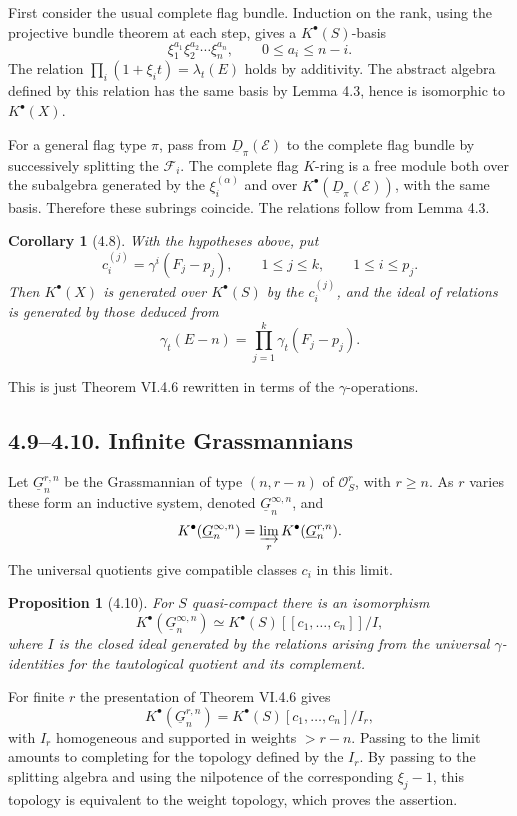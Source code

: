 \documentclass[13pt]{extarticle}
\newcommand{\cO}{\mathcal O}
\newtheorem*{proposition}{Proposition}
\newtheorem*{corollary}{Corollary}
\begin{document}
First consider the usual complete flag bundle. Induction on the rank, using the projective bundle theorem at each step, gives a $K^{\bullet}(S)$-basis
\[
\xi_1^{a_1}\xi_2^{a_2}\cdots\xi_n^{a_n},
\qquad
0\leq a_i\leq n-i.
\]
The relation $\prod_i(1+\xi_it)=\lambda_t(E)$ holds by additivity. The abstract algebra defined by this relation has the same basis by Lemma 4.3, hence is isomorphic to $K^{\bullet}(X)$.

For a general flag type $\pi$, pass from $\underline D_\pi(\mathcal E)$ to the complete flag bundle by successively splitting the $\mathcal F_i$. The complete flag $K$-ring is a free module both over the subalgebra generated by the $\xi_i^{(\alpha)}$ and over $K^{\bullet}(\underline D_\pi(\mathcal E))$, with the same basis. Therefore these subrings coincide. The relations follow from Lemma 4.3.

\begin{corollary}[4.8]
With the hypotheses above, put
\[
c_i^{(j)}=\gamma^i(F_j-p_j),
\qquad 1\leq j\leq k,
\qquad 1\leq i\leq p_j.
\]
Then $K^{\bullet}(X)$ is generated over $K^{\bullet}(S)$ by the $c_i^{(j)}$, and the ideal of relations is generated by those deduced from
\begin{equation}\label{eq:VI.4.8}
\gamma_t(E-n)=\prod_{j=1}^{k}\gamma_t(F_j-p_j).
\end{equation}
\end{corollary}
This is just Theorem VI.4.6 rewritten in terms of the $\gamma$-operations.

\subsection*{4.9--4.10. Infinite Grassmannians}
Let $\underline G_n^{r,n}$ be the Grassmannian of type $(n,r-n)$ of $\cO_S^r$, with $r\geq n$. As $r$ varies these form an inductive system, denoted $\underline G_n^{\infty,n}$, and
\[
K^{\bullet}(\underline G_n^{\infty,n})=\varinjlim_r K^{\bullet}(\underline G_n^{r,n}).
\]
The universal quotients give compatible classes $c_i$ in this limit.

\begin{proposition}[4.10]
For $S$ quasi-compact there is an isomorphism
\[
K^{\bullet}(\underline G_n^{\infty,n})\simeq K^{\bullet}(S)[[c_1,\ldots,c_n]]/I,
\]
where $I$ is the closed ideal generated by the relations arising from the universal $\gamma$-identities for the tautological quotient and its complement.
\end{proposition}

For finite $r$ the presentation of Theorem VI.4.6 gives
\[
K^{\bullet}(\underline G_n^{r,n})=K^{\bullet}(S)[c_1,\ldots,c_n]/I_r,
\]
with $I_r$ homogeneous and supported in weights $>r-n$. Passing to the limit amounts to completing for the topology defined by the $I_r$. By passing to the splitting algebra and using the nilpotence of the corresponding $\xi_j-1$, this topology is equivalent to the weight topology, which proves the assertion.
\end{document}

